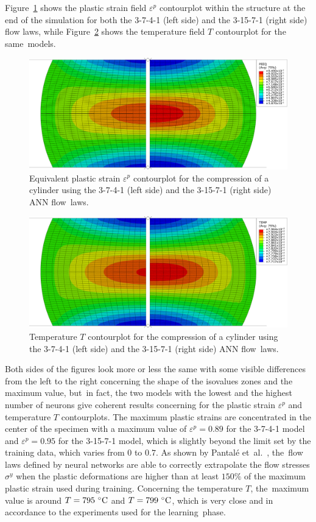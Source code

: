 \documentclass[algorithms,article,accept,pdftex,moreauthors]{Definitions/mdpi}
\begin{document}
Figure~\ref{fig:peeqContourplot} shows the plastic strain field $\varepsilon^p$ contourplot within the structure at the end of the simulation for both the 3-7-4-1 (left side) and the 3-15-7-1 (right side) flow laws, while Figure~\ref{fig:dpeeqContourplot} shows the temperature field $T$ contourplot for the same~models.
\begin{figure}[H]
\includegraphics[width=0.90\columnwidth]{Figures/peeq}
\caption{Equivalent plastic strain $\varepsilon^p$ contourplot for the compression of a cylinder using the 3-7-4-1 (left side) and the 3-15-7-1 (right side) ANN flow~laws.}
\label{fig:peeqContourplot}
\end{figure}
\unskip
\begin{figure}[H]
\includegraphics[width=0.90\columnwidth]{Figures/temp}
\caption{Temperature $T$ contourplot for the compression of a cylinder using the 3-7-4-1 (left side) and the 3-15-7-1 (right side) ANN flow~laws.}
\label{fig:dpeeqContourplot}
\end{figure}
Both sides of the figures look more or less the same with some visible differences from the left to the right concerning the shape of the isovalues zones and the maximum value, but~in fact, the two models with the lowest and the highest number of neurons give coherent results concerning for the plastic strain $\varepsilon^p$ and temperature $T$ contourplots.
The maximum plastic strains are concentrated in the center of the specimen with a maximum value of $\varepsilon^p=0.89$ for the 3-7-4-1 model and $\varepsilon^p=0.95$ for the 3-15-7-1 model, which is slightly beyond the limit set by the training data, which varies from $0$ to $0.7$.
As shown by Pantalé et~al.~\cite{Pantale-2021}, the~flow laws defined by neural networks are able to correctly extrapolate the flow stresses $\sigma^y$ when the plastic deformations are higher than at least $150\%$ of the maximum plastic strain used during training.
Concerning the temperature $T$, the~maximum value is around $T=795~\celsius$ and $T=799~\celsius$, which is very close and in accordance to the experiments used for the learning~phase.
\end{document}
